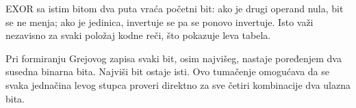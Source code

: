 EXOR sa istim bitom dva puta vraća početni bit: ako je drugi operand nula, bit se ne menja; ako je jedinica, invertuje se pa se ponovo invertuje. Isto važi nezavisno za svaki položaj kodne reči, što pokazuje leva tabela.

Pri formiranju Grejovog zapisa svaki bit, osim najvišeg, nastaje poređenjem dva susedna binarna bita. Najviši bit ostaje isti. Ovo tumačenje omogućava da se svaka jednačina levog stupca proveri direktno za sve četiri kombinacije dva ulazna bita.
